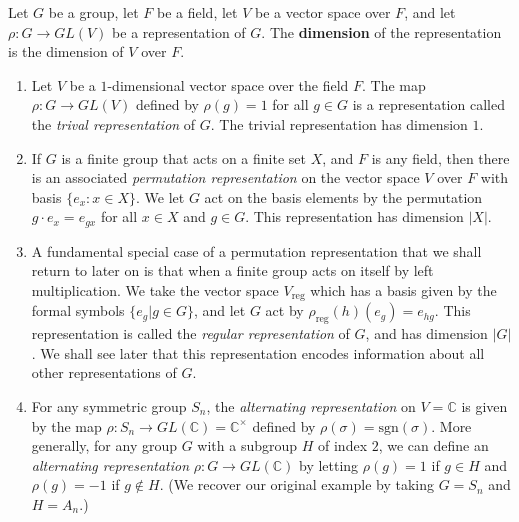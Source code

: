  \begin{defn}Let $G$ be a group, let $F$ be a field, let $V$ be a vector space over $F$, and let $\rho \colon G \to GL(V)$ be a representation of $G$.  The \textbf{dimension} of the representation is the dimension of $V$ over $F$.  
 \end{defn}
 \begin{example}
 \begin{enumerate}
\item Let $V$ be a $1$-dimensional vector space over the field $F$.  The map $\rho \colon G \to GL(V)$ defined by $\rho(g) = 1$ for all $g \in G$ is a representation called the \textit{trival representation} of $G$.  The trivial representation has dimension $1$.

\item If $G$ is a finite group that acts on a finite set $X$, and $F$ is any field, then there is an associated \textit{permutation representation}  on the vector space $V$ over $F$ with basis $\{e_x \colon x \in X\}$.  We let $G$ act on the basis elements by the permutation $g \cdot e_x = e_{gx}$ for all $x \in X$ and $g \in G$. This representation has dimension $|X|$. 

\item A fundamental special case of a permutation representation that we shall return to later on is that when a finite group acts on itself by left multiplication. We take the vector space $V_{\text{reg}}$ which has a basis given by the formal symbols $\{ e_g | g \in G \}$, and let $G$ act by $\rho_{\text{reg}}(h) (e_g) = e_{hg}$.  This representation is called the \textit{regular representation} of $G$, and has dimension $|G|$. We shall see later that this representation encodes information about all other representations of $G$.

\item For any symmetric group $S_n$, the \textit{alternating representation} on $V=\mathbb{C}$ is given by the map $\rho \colon S_n \to GL(\mathbb{C})=\mathbb{C}^\times$ defined by $\rho(\sigma)=\text{sgn}(\sigma)$. More generally, for any group $G$ with a subgroup $H$ of index $2$, we can define an \textit{alternating representation} $\rho \colon G \to GL(\mathbb{C})$ by letting $\rho(g) = 1$ if $g \in H$ and $\rho(g) = -1$ if $g \notin H$.  (We recover our original example  by taking $G= S_n$ and $H=A_n$.)

\end{enumerate}
 \end{example}

